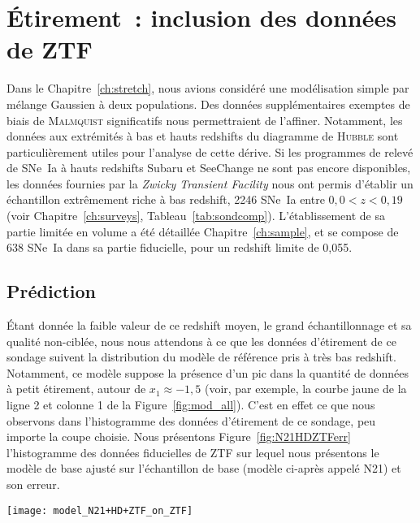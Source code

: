 \documentclass[../main/main.tex]{subfiles}
\begin{document}
\newpage

\section{Étirement~: inclusion des données de ZTF}\label{sec:xztf}

Dans le Chapitre~\ref{ch:stretch}, nous avions considéré une modélisation simple
par mélange Gaussien à deux populations. Des données supplémentaires exemptes de
biais de \textsc{Malmquist} significatifs nous permettraient de l'affiner.
Notamment, les données aux extrémités à bas et hauts redshifts du diagramme de
\textsc{Hubble} sont particulièrement utiles pour l'analyse de cette dérive. Si
les programmes de relevé de SNe~Ia à hauts redshifts Subaru et SeeChange ne sont
pas encore disponibles, les données fournies par la \textit{Zwicky Transient
Facility} \citep[ZTF,][]{bellm2019, graham2019} nous ont permis d'établir un
échantillon extrêmement riche à bas redshift, 2246 SNe~Ia entre $0,0 < z < 0,19$
(voir Chapitre~\ref{ch:surveys}, Tableau~\ref{tab:sondcomp}). L'établissement de
sa partie limitée en volume a été détaillée Chapitre~\ref{ch:sample}, et se
compose de 638 SNe~Ia dans sa partie fiducielle, pour un redshift limite de
0,055.

\subsection{Prédiction}\label{ssec:xpred}

Étant donnée la faible valeur de ce redshift moyen, le grand échantillonnage et
sa qualité non-ciblée, nous nous attendons à ce que les données d'étirement de
ce sondage suivent la distribution du modèle de référence pris à très bas
redshift. Notamment, ce modèle suppose la présence d'un pic dans la quantité de
données à petit étirement, autour de $x_1 \approx -1,5$ (voir, par exemple, la
courbe jaune de la ligne 2 et colonne 1 de la Figure~\ref{fig:mod_all}). C'est
en effet ce que nous observons dans l'histogramme des données d'étirement de ce
sondage, peu importe la coupe choisie. Nous présentons
Figure~\ref{fig:N21HDZTFerr} l'histogramme des données fiducielles de ZTF sur
lequel nous présentons le modèle de base ajusté sur l'échantillon de base
(modèle ci-après appelé N21) et son erreur.

\begin{SCfigure}[1][ht]
    \texttt{[image: model\_N21+HD+ZTF\_on\_ZTF]}
    \caption[Accord entre les modèles N21+ZTF et HD+ZTF et l'histogramme des
    étirements de ZTF]{\textit{En violet}~: histogramme des étirements de ZTF.
        \textit{En bleu (violet) et leurs bandes}~: modèles de base ajustés sur
        l'échantillon de base, N21 (échantillon avec ZTF, N21+ZTF) au redshift
        moyen de ZTF et leur erreur. \textit{En fin pointillés verts (ligne
        continue)}~: modèles Howell+dérive ajustés sur l'échantillon de base, HD
    (échantillon avec ZTF, HD+ZTF).}
    \label{fig:N21HDZTFerr}
\end{SCfigure}
\end{document}

